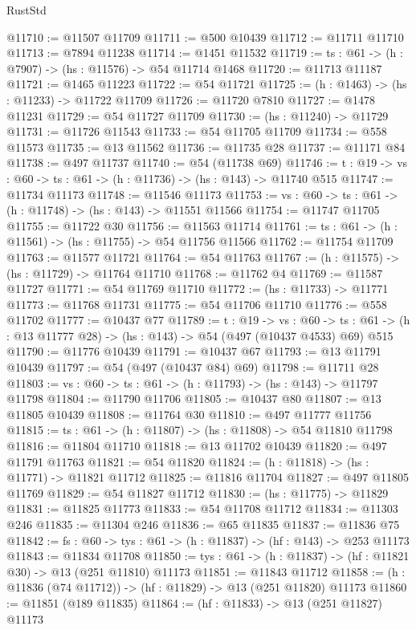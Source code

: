 \begin{lexlean}{RustStd}
\begin{coremodule}
@11710 := @11507 @11709
@11711 := @500 @10439
@11712 := @11711 @11710
@11713 := @7894 @11238
@11714 := @1451 @11532
@11719 := {ts : @61} -> (h : @7907) -> (hs : @11576) -> @54 @11714 @1468
@11720 := @11713 @11187
@11721 := @1465 @11223
@11722 := @54 @11721
@11725 := (h : @1463) -> (hs : @11233) -> @11722 @11709
@11726 := @11720 @7810
@11727 := @1478 @11231
@11729 := @54 @11727 @11709
@11730 := (hs : @11240) -> @11729
@11731 := @11726 @11543
@11733 := @54 @11705 @11709
@11734 := @558 @11573
@11735 := @13 @11562
@11736 := @11735 @28
@11737 := @11171 @84
@11738 := @497 @11737
@11740 := @54 (@11738 @69)
@11746 := {t : @19} -> {vs : @60} -> {ts : @61} -> (h : @11736) -> (hs : @143) -> @11740 @515
@11747 := @11734 @11173
@11748 := @11546 @11173
@11753 := {vs : @60} -> {ts : @61} -> (h : @11748) -> (hs : @143) -> @11551 @11566
@11754 := @11747 @11705
@11755 := @11722 @30
@11756 := @11563 @11714
@11761 := {ts : @61} -> (h : @11561) -> (hs : @11755) -> @54 @11756 @11566
@11762 := @11754 @11709
@11763 := @11577 @11721
@11764 := @54 @11763
@11767 := (h : @11575) -> (hs : @11729) -> @11764 @11710
@11768 := @11762 @4
@11769 := @11587 @11727
@11771 := @54 @11769 @11710
@11772 := (hs : @11733) -> @11771
@11773 := @11768 @11731
@11775 := @54 @11706 @11710
@11776 := @558 @11702
@11777 := @10437 @77
@11789 := {t : @19} ->
  {vs : @60} ->
  {ts : @61} -> (h : @13 @11777 @28) -> (hs : @143) -> @54 (@497 (@10437 @4533) @69) @515
@11790 := @11776 @10439
@11791 := @10437 @67
@11793 := @13 @11791 @10439
@11797 := @54 (@497 (@10437 @84) @69)
@11798 := @11711 @28
@11803 := {vs : @60} -> {ts : @61} -> (h : @11793) -> (hs : @143) -> @11797 @11798
@11804 := @11790 @11706
@11805 := @10437 @80
@11807 := @13 @11805 @10439
@11808 := @11764 @30
@11810 := @497 @11777 @11756
@11815 := {ts : @61} -> (h : @11807) -> (hs : @11808) -> @54 @11810 @11798
@11816 := @11804 @11710
@11818 := @13 @11702 @10439
@11820 := @497 @11791 @11763
@11821 := @54 @11820
@11824 := (h : @11818) -> (hs : @11771) -> @11821 @11712
@11825 := @11816 @11704
@11827 := @497 @11805 @11769
@11829 := @54 @11827 @11712
@11830 := (hs : @11775) -> @11829
@11831 := @11825 @11773
@11833 := @54 @11708 @11712
@11834 := @11303 @246
@11835 := @11304 @246
@11836 := @65 @11835
@11837 := @11836 @75
@11842 := {fs : @60} -> {tys : @61} -> (h : @11837) -> (hf : @143) -> @253 @11173
@11843 := @11834 @11708
@11850 := {tys : @61} -> (h : @11837) -> (hf : @11821 @30) -> @13 (@251 @11810) @11173
@11851 := @11843 @11712
@11858 := (h : @11836 (@74 @11712)) -> (hf : @11829) -> @13 (@251 @11820) @11173
@11860 := @11851 (@189 @11835)
@11864 := (hf : @11833) -> @13 (@251 @11827) @11173

\end{coremodule}
\end{lexlean}
